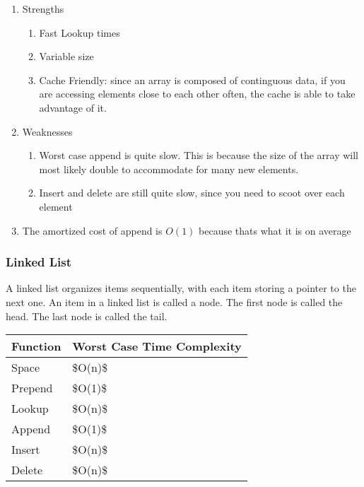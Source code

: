 \documentclass{article}
\begin{document}
\begin{enumerate}
    \item Strengths
    \begin{enumerate}
        \item Fast Lookup times
        \item Variable size
        \item Cache Friendly: since an array is composed of continguous data, if you are accessing elements close to each other often, the cache is able to take advantage of it.
    \end{enumerate}
    \item Weaknesses
    \begin{enumerate}   
        \item Worst case append is quite slow. This is because the size of the array will most likely double to accommodate for many new elements.
        \item Insert and delete are still quite slow, since you need to scoot over each element
    \end{enumerate}
    \item The amortized cost of append is $O(1)$ because thats what it is on average
\end{enumerate}


\subsubsection{Linked List} 
 
A linked list organizes items sequentially, with each item storing a pointer to the next one. An item in a linked list is called a node. The first node is called the head. The last node is called the tail.


 \begin{table}[!ht]
    \centering
    \begin{tabular}{|l|l|}
    \hline
        Function & Worst Case Time Complexity \\ \hline
        Space & \$O(n)\$ \\ \hline
        Prepend & \$O(1)\$ \\ \hline
        Lookup & \$O(n)\$ \\ \hline
        Append & \$O(1)\$ \\ \hline
        Insert & \$O(n)\$ \\ \hline
        Delete & \$O(n)\$ \\ \hline
    \end{tabular}
\end{table}
\end{document}
